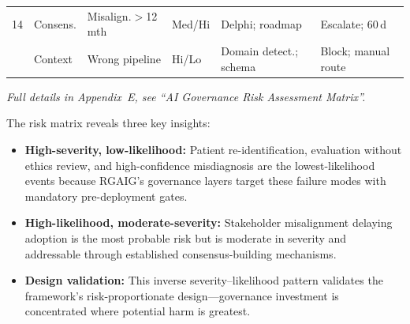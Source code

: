 \begin{table}[!htbp]
\begin{tabularx}{\textwidth}{@{} p{0.4cm} >{\raggedright\arraybackslash}p{1.8cm} L >{\raggedright\arraybackslash}p{1.3cm} L L @{}}
14 & Consens. & Misalign.$>$12\,mth & Med/Hi & Delphi; roadmap & Escalate; 60\,d \\
 & Context & Wrong pipeline & Hi/Lo & Domain detect.; schema & Block; manual route \\
\bottomrule
\end{tabularx}
\end{table}
\fi
\noindent\textit{Full details in Appendix~E, see ``AI Governance Risk Assessment Matrix''.}


The risk matrix reveals three key insights:

\begin{itemize}
    \item \textbf{High-severity, low-likelihood:} Patient re-identification, evaluation without ethics review, and high-confidence misdiagnosis are the lowest-likelihood events because RGAIG's governance layers target these failure modes with mandatory pre-deployment gates.
    \item \textbf{High-likelihood, moderate-severity:} Stakeholder misalignment delaying adoption is the most probable risk but is moderate in severity and addressable through established consensus-building mechanisms.
    \item \textbf{Design validation:} This inverse severity--likelihood pattern validates the framework's risk-proportionate design---governance investment is concentrated where potential harm is greatest.
\end{itemize}

